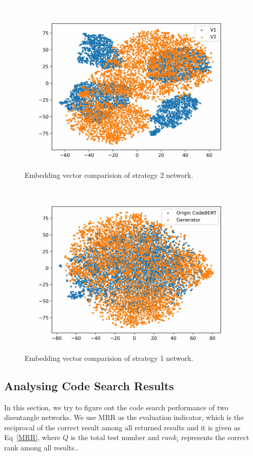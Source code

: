\begin{figure}[htb]
	\centering
	\includegraphics[width=0.9\linewidth]{imgs/st2_emb.pdf}
	\caption{Embedding vector comparision of strategy 2 network.}
	\label{fig:st2_emb}
\end{figure}

\begin{figure}[htb]
	\centering
	\includegraphics[width=0.9\linewidth]{imgs/gan_emb.pdf}
	\caption{Embedding vector comparision of strategy 1 network.}
	\label{fig:st2_gan}
\end{figure}

\subsection{Analysing Code Search Results}
In this section, 
we try to figure out the code search performance of two disentangle networks. 
We use MRR as the evaluation indicator, 
which is the reciprocal of the correct result among all returned results 
and it is given as Eq~\ref{MRR}, where $Q$ is the total test number and $rank_i$ represents the correct rank among all results..


